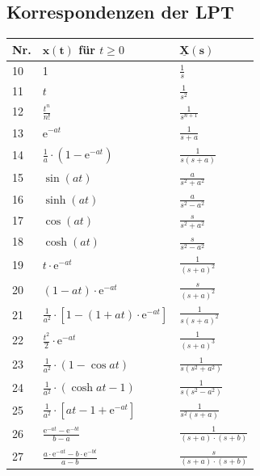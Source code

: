 \begin{table}[h!]
	\subsection{Korrespondenzen der LPT}
	\renewcommand{\arraystretch}{1.7}
\begin{minipage}[t]{0.5\columnwidth}
	\begin{tabularx}{\columnwidth}{|l|l|X|}
		\hline
		Nr. & $\mathbf{x(t)}$ für $t \geq 0$ & $\mathbf{\underline{X}(s)}$ \\
		\hline 
		10 & 1 & $\frac{1}{s}$ \\
		\hline
		11 & $t$ & $\frac{1}{s^2}$ \\
		\hline
		12 & $\frac{t^n}{n!}$ & $\frac{1}{s^{n+1}}$ \\
		\hline
		13 & $\mathrm{e}^{-a t}$ & $\frac{1}{s+a}$ \\
		\hline
		14 & $\frac{1}{a} \cdot\left(1-\mathrm{e}^{-a t}\right)$ & $\frac{1}{s(s+a)}$ \\
		\hline
		15 & $\sin (a t)$ & $\frac{a}{s^2+a^2}$ \\
		\hline
		16 & $\sinh (a t)$ & $\frac{a}{s^2-a^2}$ \\
		\hline
		17 & $\cos (a t)$ & $\frac{s}{s^2+a^2}$\\
		\hline
		18 & $\cosh (a t)$ & $\frac{s}{s^2-a^2}$\\
		\hline
		19 & $t \cdot \mathrm{e}^{-a t}$ & $\frac{1}{(s+a)^2}$\\
		\hline
		20 & $(1-a t) \cdot \mathrm{e}^{-a t}$ & $\frac{s}{(s+a)^2}$\\
		\hline 21 & $\frac{1}{a^2} \cdot\left[1-(1+a t) \cdot \mathrm{e}^{-a t}\right]$ &
		$\frac{1}{s(s+a)^2}$ \\
		\hline 22 & 
		$\frac{t^2}{2} \cdot \mathrm{e}^{-a t}$ & 	$\frac{1}{(s+a)^3}$	\\
		\hline 23 & 	$\frac{1}{a^2} \cdot(1-\cos a t)$ & 	$\frac{1}{s\left(s^2+a^2\right)}$ \\
		\hline 24 & 	$\frac{1}{a^2} \cdot(\cosh a t-1)$ & 	$\frac{1}{s\left(s^2-a^2\right)}$\\
		\hline 25 & 	$\frac{1}{a^2} \cdot\left[a t-1+\mathrm{e}^{-a t}\right]$ & $\frac{1}{s^2(s+a)}$ \\
		\hline 26 & 	$\frac{\mathrm{e}^{-a t}-\mathrm{e}^{-b t}}{b-a}$& 	$\frac{1}{(s+a) \cdot(s+b)}$\\
		\hline 27 & 	$\frac{a \cdot \mathrm{e}^{-a t}-b \cdot \mathrm{e}^{-b t}}{a-b}$ & 	$\frac{s}{(s+a) \cdot(s+b)}$ \\

\end{tabularx}
\end{minipage}
\end{table}
